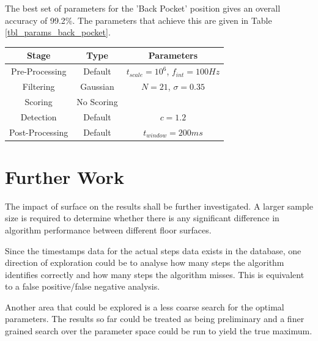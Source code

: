                 The best set of parameters for the 'Back Pocket' position gives an overall accuracy of 99.2\%. The parameters that achieve this are given in Table \ref{tbl_params_back_pocket}.

                \begin{center}
                    \label{tbl_params_back_pocket}
                    \begin{tabular}{|c|c|c|}
                        \hline
                        Stage & Type & Parameters \\
                        \hline
                        Pre-Processing & Default & $t_{scale}=10^6$, $f_{int}=100Hz$ \\
                        Filtering & Gaussian & $N=21$, $\sigma=0.35$ \\
                        Scoring & No Scoring & \\
                        Detection & Default & $c=1.2$ \\
                        Post-Processing & Default & $t_{window}=200ms$ \\
                        \hline
                    \end{tabular}
                \end{center}



    \chapter{Further Work}
        The impact of surface on the results shall be further investigated. A larger sample size is required to determine whether there is any significant difference in algorithm performance between different floor surfaces.

        Since the timestamps data for the actual steps data exists in the database, one direction of exploration could be to analyse how many steps the algorithm identifies correctly and how many steps the algorithm misses. This is equivalent to a false positive/false negative analysis.

        Another area that could be explored is a less coarse search for the optimal parameters. The results so far could be treated as being preliminary and a finer grained search over the parameter space could be run to yield the true maximum.